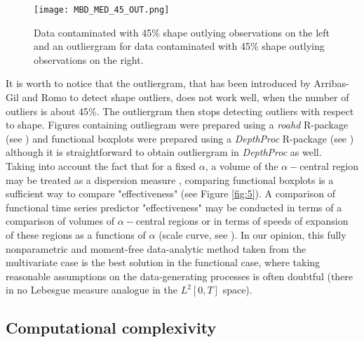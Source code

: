 \documentclass[12pt,a4paper]{article}
\numberwithin{equation}{section}
\begin{document}
\begin{figure*}
\texttt{[image: MBD\_MED\_45\_OUT.png]}
\caption{Data contaminated with 45\% shape outlying observations on the left and an outliergram for data contaminated with 45\% shape outlying observations on the right.}
\label{fig:3}
\end{figure*}
It is worth to notice that the outliergram, that has been introduced by Arribas-Gil and Romo \cite{Arribas} to detect shape outliers,  
does not work well, when the number of outliers is about 45\%. The outliergram then stops detecting outliers with respect to shape.
Figures containing outliegram were prepared using a \emph{roahd} R-package (see \cite{Tarabelloni}) and functional boxplots were prepared using a \emph{DepthProc} R-package (see \cite{Kos1}) although it is straightforward to obtain outliergram in \emph{DepthProc} as well.
\\ Taking into account the fact that for a fixed $\alpha$, a volume of the $\alpha-$central region may be treated as a dispersion measure \cite{LPS}, comparing functional boxplots is a sufficient way to compare "effectiveness" (see Figure \ref{fig:5}). A comparison of functional time series predictor "effectiveness" may be conducted in terms of a comparison of volumes of $\alpha-$central regions or in terms of speeds of expansion of these regions as a functions of $\alpha$ (scale curve, see \cite{Lopez_scale}).
In our opinion, this fully nonparametric and moment-free data-analytic method taken from the multivariate case is the best solution in the functional case, where taking reasonable assumptions on the data-generating processes is often doubtful (there in no Lebesgue measure analogue in the $L^2[0,T]$ space).


\subsection{Computational complexivity} 
\end{document}
